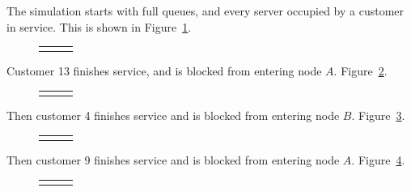 \documentclass{article}
\begin{document}
The simulation starts with full queues, and every server occupied by a customer in service. This is shown in Figure~\ref{fig:general_buildup_1}.

\begin{figure}[H]
  \begin{tabular}{ c c c }
       & \hspace{0.1\textwidth} &
       \\
  \end{tabular}
  \caption{}
  \label{fig:general_buildup_1}
\end{figure}

Customer 13 finishes service, and is blocked from entering node $A$. Figure~\ref{fig:general_buildup_2}.

\begin{figure}[H]
  \begin{tabular}{ c c c }
       & \hspace{0.1\textwidth} &
       \\
  \end{tabular}
  \caption{}
  \label{fig:general_buildup_2}
\end{figure}

Then customer 4 finishes service and is blocked from entering node $B$. Figure~\ref{fig:general_buildup_3}.

\begin{figure}[H]
  \begin{tabular}{ c c c }
       & \hspace{0.1\textwidth} &
       \\
  \end{tabular}
  \caption{}
  \label{fig:general_buildup_3}
\end{figure}

Then customer 9 finishes service and is blocked from entering node $A$. Figure~\ref{fig:general_buildup_4}.

\begin{figure}[H]
  \begin{tabular}{ c c c }
       & \hspace{0.1\textwidth} &
       \\
  \end{tabular}
  \caption{}
  \label{fig:general_buildup_4}
\end{figure}
\end{document}
